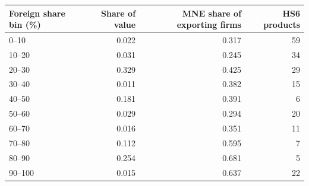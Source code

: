 \begin{tabular}{lrrr}
\toprule
Foreign share bin (\%) & Share of value & MNE share of exporting firms & HS6 products \\
\midrule
0--10 & 0.022 & 0.317 & 59 \\
10--20 & 0.031 & 0.245 & 34 \\
20--30 & 0.329 & 0.425 & 29 \\
30--40 & 0.011 & 0.382 & 15 \\
40--50 & 0.181 & 0.391 & 6 \\
50--60 & 0.029 & 0.294 & 20 \\
60--70 & 0.016 & 0.351 & 11 \\
70--80 & 0.112 & 0.595 & 7 \\
80--90 & 0.254 & 0.681 & 5 \\
90--100 & 0.015 & 0.637 & 22 \\
\bottomrule
\end{tabular}
